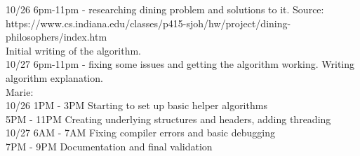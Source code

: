 \documentclass[letterpaper,10pt,titlepage]{article}
\begin{document}
10/26 6pm-11pm - researching dining problem and solutions to it. Source: https://www.cs.indiana.edu/classes/p415-sjoh/hw/project/dining-philosophers/index.htm\\
Initial writing of the algorithm.\\

10/27 6pm-11pm - fixing some issues and getting the algorithm working. Writing algorithm explanation.\\

Marie:\\

10/26 	1PM - 3PM Starting to set up basic helper algorithms\\
		5PM - 11PM Creating underlying structures and headers, adding threading\\

10/27	6AM - 7AM Fixing compiler errors and basic debugging\\
		7PM - 9PM Documentation and final validation\\
\end{document}

